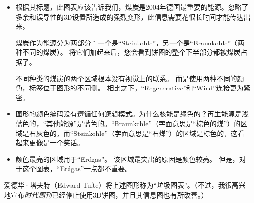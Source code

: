 \begin{itemize}

    \item 根据其标题，此图表应该告诉我们，煤炭是2004年德国最重要的能源。忽略了多余和误导性的3D设置所造成的强烈变形，此信息需要花很长时间才能传达出来。
    
    煤炭作为能源分为两部分：一个是``Steinkohle''，另一个是``Braunkohle''（两种不同的煤炭）。 将它们加起来后，您会看到饼图的整个下半部分都被煤炭占据了。

    不同种类的煤炭的两个区域根本没有视觉上的联系。 而是使用两种不同的颜色，标签位于图形的不同侧。 相比之下，``Regenerative''和``Wind''连接更为紧密。
    \item 图形的颜色编码没有遵循任何逻辑模式。为什么核能是绿色的？再生能源是浅蓝色的，``其他能源''是蓝色的。``Braunkohle''（字面意思是``棕色的煤''）的区域是石灰色的，而``Steinkohle''（字面意思是``石煤''）的区域是棕色的，这看起来更像是一个笑话。
    \item 颜色最亮的区域用于``Erdgas''。 该区域最突出的原因是颜色较亮。 但是，对于这个图表，``Erdgas''一点都不重要。
\end{itemize}
%
%
爱德华·塔夫特（Edward Tufte）将上述图形称为``垃圾图表''。（不过，我很高兴地宣布\emph{时代周刊}已经停止使用3D饼图，并且其信息图也有所改善。）

